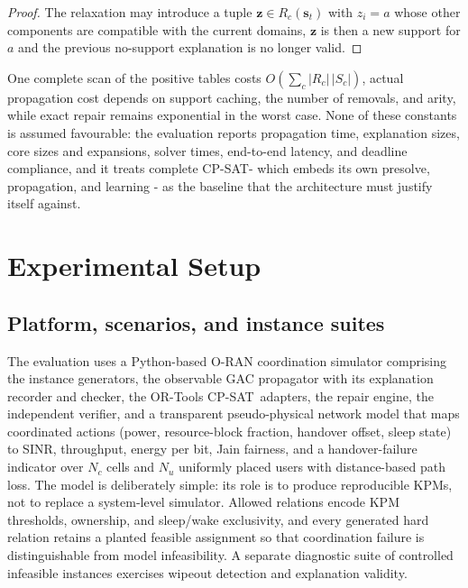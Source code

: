 \documentclass[pdflatex,sn-mathphys-num,iicol,oneside]{sn-jnl}
\newcommand{\cpsat}{\textsc{CP-SAT}}
\begin{document}
\begin{proof}
The relaxation may introduce a tuple $\bm{z}\in R_c(\bm{s}_t)$ with
$z_i=a$ whose other components are compatible with the current
domains, $\bm{z}$ is then a new support for $a$ and the previous
no-support explanation is no longer valid.
\end{proof}

One complete scan of the positive tables costs
$O(\sum_{c}|R_c|\,|S_c|)$, actual propagation cost depends on support
caching, the number of removals, and arity, while exact repair remains
exponential in the worst case. None of these constants is assumed
favourable: the evaluation reports propagation time, explanation
sizes, core sizes and expansions, solver times, end-to-end latency,
and deadline compliance, and it treats complete \cpsat - which embeds
its own presolve, propagation, and learning - as the baseline that the
architecture must justify itself against.
\section{Experimental Setup}
\label{sec:experiments}

\subsection{Platform, scenarios, and instance suites}

The evaluation uses a Python-based O-RAN coordination simulator
comprising the instance generators, the observable GAC propagator with
its explanation recorder and checker, the OR-Tools \cpsat\ adapters,
the repair engine, the independent verifier, and a transparent
pseudo-physical network model that maps coordinated actions (power,
resource-block fraction, handover offset, sleep state) to SINR,
throughput, energy per bit, Jain fairness, and a handover-failure
indicator over $N_c$ cells and $N_u$ uniformly placed users with
distance-based path loss. The model is deliberately simple: its role
is to produce reproducible KPMs, not to replace a system-level
simulator. Allowed relations encode KPM thresholds, ownership, and
sleep/wake exclusivity, and every generated hard relation retains a
planted feasible assignment so that coordination failure is
distinguishable from model infeasibility. A separate diagnostic suite
of controlled infeasible instances exercises wipeout detection and
explanation validity.
\end{document}
